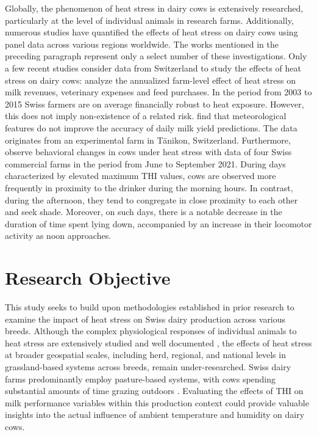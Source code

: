 Globally, the phenomenon of heat stress in dairy cows is extensively researched, particularly at the level of individual animals in research farms. Additionally, numerous studies have quantified the effects of heat stress on dairy cows using panel data across various regions worldwide. The works mentioned in the preceding paragraph represent only a select number of these investigations. Only a few recent studies consider data from Switzerland to study the effects of heat stress on dairy cows: \cite{bucheli_heat_2022} analyze the annualized farm-level effect of heat stress on milk revenues, veterinary expenses and feed purchases. In the period from 2003 to 2015 Swiss farmers are on average financially robust to heat exposure. However, this does not imply non-existence of a related risk. \cite{gasser_can_2023} find that meteorological features do not improve the accuracy of daily milk yield predictions. The data originates from an experimental farm in Tänikon, Switzerland. Furthermore, \cite{holinger_behavioural_2024} observe behavioral changes in cows under heat stress with data of four Swiss commercial farms in the period from June to September 2021. During days characterized by elevated maximum THI values, cows are observed more frequently in proximity to the drinker during the morning hours. In contrast, during the afternoon, they tend to congregate in close proximity to each other and seek shade. Moreover, on such days, there is a notable decrease in the duration of time spent lying down, accompanied by an increase in their locomotor activity as noon approaches.

\section{Research Objective}
This study seeks to build upon methodologies established in prior research to examine the impact of heat stress on Swiss dairy production across various breeds. Although the complex physiological responses of individual animals to heat stress are extensively studied and well documented \citep{kadzere_heat_2002,becker_invited_2020}, the effects of heat stress at broader geospatial scales, including herd, regional, and national levels in grassland-based systems across breeds, remain under-researched. Swiss dairy farms predominantly employ pasture-based systems, with cows spending substantial amounts of time grazing outdoors \citep{agrarbericht_2023}. Evaluating the effects of THI on milk performance variables within this production context could provide valuable insights into the actual influence of ambient temperature and humidity on dairy cows.

